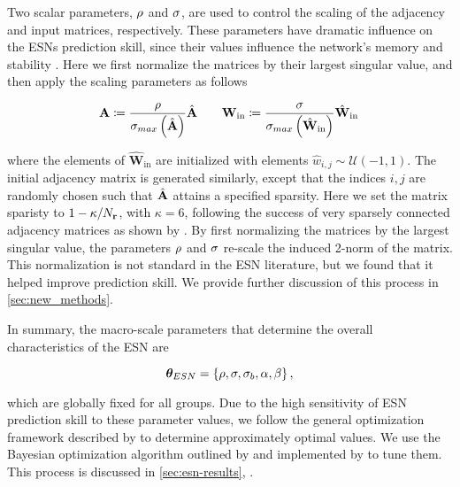 Two scalar parameters, $\rho$ and $\sigma$,
are used to control the scaling of the adjacency and input matrices,
respectively.
These parameters have dramatic influence on the ESNs prediction skill, since their
values influence the network's memory and stability
\citep{lukosevicius_practical_2012,hermans_memory_2010}.
Here we first normalize the matrices by their largest singular value, and then
apply the scaling parameters as follows
\begin{linenomath*}\begin{equation*}
    \mathbf{A} \coloneqq
    \dfrac{\rho}{\sigma_{max}\left(\hat{\mathbf{A}}\right)}
    \hat{\mathbf{A}}
    \qquad
    \mathbf{W}_\text{in} \coloneqq
    \dfrac{\sigma}{\sigma_{max}\left(\hat{\mathbf{W}}_\text{in}\right)}
    \hat{\mathbf{W}}_\text{in} \,
\end{equation*}\end{linenomath*}
where the elements of $\hat{\mathbf{W}}_\text{in}$
are initialized with elements $\hat{w}_{i,j}\sim\mathcal{U}(-1,1)$.
The initial adjacency matrix is generated similarly, except that the indices
$i,j$ are randomly chosen such that $\hat{\mathbf{A}}$ attains a specified
sparsity.
Here we set the matrix sparisty to $1 - \kappa / N_{\mathbf{r}}$, with $\kappa=6$,
following the success of very sparsely connected adjacency matrices as shown by
\citet{griffith_forecasting_2019}.
By first normalizing the matrices by the largest singular value, the parameters
$\rho$ and $\sigma$ re-scale the induced 2-norm of
the matrix.
This normalization is not standard in the ESN literature, but we found that it
helped improve prediction skill.
We provide further discussion of this process in \cref{sec:new_methods}.

In summary, the macro-scale parameters that determine the overall
characteristics of the ESN are

\begin{linenomath*}\begin{equation}
    \bm{\theta}_{ESN} =
    \{ \rho, \sigma, \sigma_{b}, \alpha, \beta \} \,
    ,
    \label{eq:rc-hyperparameters}
\end{equation}\end{linenomath*}
which are globally fixed for all groups.
Due to the high sensitivity of ESN prediction skill to these parameter values,
we follow the general optimization framework described by
\citet{platt_systematic_2022} to determine approximately optimal values.
We use the Bayesian optimization algorithm outlined by
\citet{jones_efficient_1998} and implemented by \citet{bouhlel_python_2019} to tune them.
This process is discussed in \cref{sec:esn-results}, .

